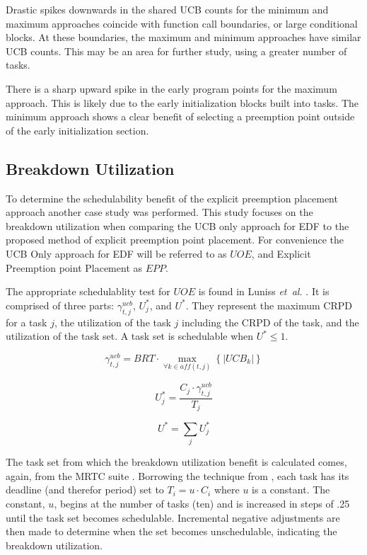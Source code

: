 Drastic spikes downwards in the shared UCB counts for the minimum and
maximum approaches coincide with function call boundaries, or large
conditional blocks. At these boundaries, the maximum and minimum
approaches have similar UCB counts. This may be an area for further
study, using a greater number of tasks.

There is a sharp upward spike in the early program points for the
maximum approach. This is likely due to the early initialization
blocks built into tasks. The minimum approach shows a clear benefit of
selecting a preemption point outside of the early initialization
section. 

\subsection{Breakdown Utilization}

To determine the schedulability benefit of the explicit preemption
placement approach another case study was performed. This study
focuses on the breakdown utilization when comparing the UCB only
approach for EDF \cite{lunniss:13} to the proposed method of explicit
preemption point placement. For convenience the UCB Only approach for
EDF will be referred to as ${UOE}$, and Explicit Preemption point
Placement as ${EPP}$.

The appropriate schedulablity test for ${UOE}$ is found in
Luniss \emph{et~al.} \cite{lunniss:13}. It is comprised of three
parts: ${\gamma^{ucb}_{t,j}}$, ${U^*_j}$, and ${U^*}$. They represent
the maximum CRPD for a task ${j}$, the utilization of the task ${j}$
including the CRPD of the task, and the utilization of the task set.
A task set is schedulable when ${U^* \le 1}$.

\begin{equation}
  \gamma^{ucb}_{t,j} = BRT \cdot \max\limits_{\forall k \in aff(t,j)}
  \left\{ \left| UCB_k \right| \right\}
\end{equation}

\begin{equation}
  U^*_j = \frac{C_j \cdot \gamma^{ucb}_{t,j}}{T_j}
\end{equation}

\begin{equation}
  U^* = \sum_j U^*_j
\end{equation}

The task set from which the breakdown utilization benefit is
calculated comes, again, from the MRTC suite \cite{mrtc:01}. Borrowing
the technique from \cite{lunniss:13}, each task has its deadline (and
therefor period) set to ${T_i = u \cdot C_i}$
where ${u}$ is a constant. The constant, ${u}$, begins at the number
of tasks (ten) and is increased in steps of .25 until the task set
becomes schedulable. Incremental negative adjustments are then made to
determine when the set becomes unschedulable, indicating the breakdown
utilization.

